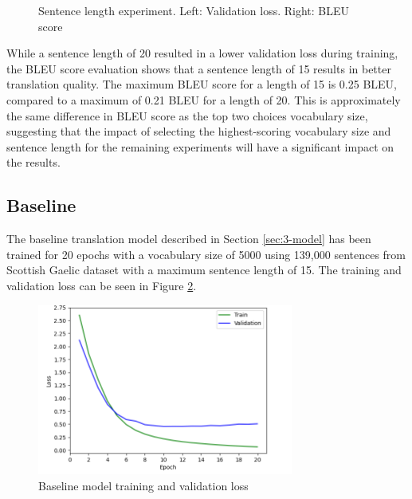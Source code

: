 \begin{figure}[ht!]
\centering
{}
\captionsetup{justification=centering}
\caption[Sentence length experiment validation loss and BLEU score]{Sentence length experiment. Left: Validation loss. Right: BLEU score}
\label{fig:length_loss_bleu}
\end{figure}

While a sentence length of 20 resulted in a lower validation loss during training, the \acrshort{BLEU} score evaluation shows that a sentence length of 15 results in better translation quality. The maximum \acrshort{BLEU} score for a length of 15 is 0.25 \acrshort{BLEU}, compared to a maximum of 0.21 \acrshort{BLEU} for a length of 20. This is approximately the same difference in \acrshort{BLEU} score as the top two choices vocabulary size, suggesting that the impact of selecting the highest-scoring vocabulary size and sentence length for the remaining experiments will have a significant impact on the results. 


\subsection{Baseline}
\label{sec:4-baseline}

The baseline translation model described in Section \ref{sec:3-model} has been trained for 20 epochs with a vocabulary size of 5000 using 139,000 sentences from Scottish Gaelic dataset with a maximum sentence length of 15. The training and validation loss can be seen in Figure \ref{fig:loss_baseline}.

\begin{figure}[ht!]
\centering
\includegraphics[width=0.75\textwidth]{media/experiments/loss/5k/loss_baseline.png}
\captionsetup{justification=centering}
\caption[Baseline model training and validation loss]{Baseline model training and validation loss}
\label{fig:loss_baseline}
\end{figure}

